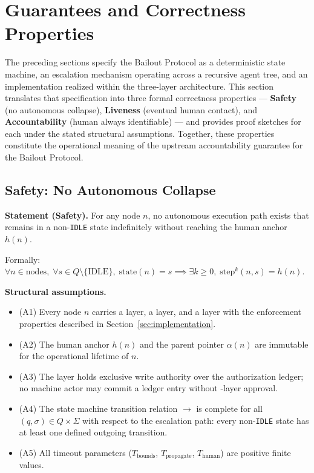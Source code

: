 \section{Guarantees and Correctness Properties}
\label{sec:properties}

The preceding sections specify the Bailout Protocol as a deterministic state machine, an escalation mechanism operating across a recursive agent tree, and an implementation realized within the \bxthree{} three-layer architecture. This section translates that specification into three formal correctness properties — \textbf{Safety} (no autonomous collapse), \textbf{Liveness} (eventual human contact), and \textbf{Accountability} (human always identifiable) — and provides proof sketches for each under the stated structural assumptions. Together, these properties constitute the operational meaning of the upstream accountability guarantee for the Bailout Protocol.

\bigskip
\subsection{Safety: No Autonomous Collapse}
\label{sec:safety}

\textbf{Statement (Safety).} For any \bxthree{} node $n$, no autonomous execution path exists that remains in a non-\texttt{IDLE} state indefinitely without reaching the human anchor $h(n)$.

\bigskip
\noindent
Formally: $\forall n \in \text{nodes},\; \forall s \in Q \setminus \{\text{IDLE}\},\; \text{state}(n) = s \implies \exists k \geq 0,\; \text{step}^k(n, s) = h(n)$.

\bigskip
\noindent
\textbf{Structural assumptions.}
\begin{itemize}\itemsep=0pt
\item[\namedlabel{asm:layer}]{(A1)} Every node $n$ carries a \purpose{} layer, a \bounds{} layer, and a \fact{} layer with the enforcement properties described in Section~\ref{sec:implementation}.
\item[\namedlabel{asm:immutability}]{(A2)} The human anchor $h(n)$ and the parent pointer $\alpha(n)$ are immutable for the operational lifetime of $n$.
\item[\namedlabel{asm:fact-exclusive}]{(A3)} The \fact{} layer holds exclusive write authority over the authorization ledger; no machine actor may commit a ledger entry without \fact{}-layer approval.
\item[\namedlabel{asm:transition-complete}]{(A4)} The state machine transition relation $\rightarrow$ is complete for all $(q, \sigma) \in Q \times \Sigma$ with respect to the escalation path: every non-\texttt{IDLE} state has at least one defined outgoing transition.
\item[\namedlabel{asm:timeout}]{(A5)} All timeout parameters ($T_{\text{bounds}}$, $T_{\text{propagate}}$, $T_{\text{human}}$) are positive finite values.
\end{itemize}

